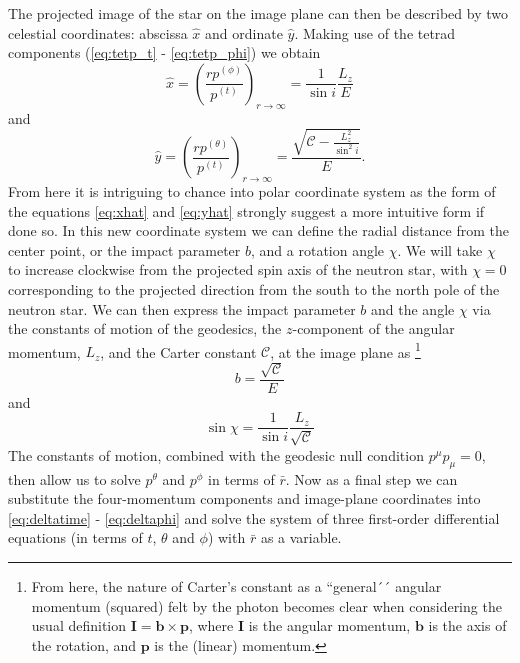 \documentclass[iop, usenatbib]{emulateapj}
\newcommand{\be}{\begin{equation}}
\newcommand{\ee}{\end{equation}}
\renewcommand{\vec}[1]{\ensuremath{\boldsymbol{#1}}​}
\newcommand{\Ca}{\ensuremath{\mathcal{C}}}
\newcommand{\rb}{\ensuremath{\bar{r}}}
\newcommand{\wb}{\ensuremath{\bar{\omega}}}
\newcommand{\nub}{\ensuremath{\bar{\nu}}}
\begin{document}
The projected image of the star on the image plane can then be described by two celestial coordinates:
abscissa $\hat{x}$ and ordinate $\hat{y}$.
Making use of the tetrad components (\ref{eq:tetp_t} - \ref{eq:tetp_phi}) we obtain \citep[][p.347]{cha}
\be\label{eq:xhat}
\hat{x} = \left( \frac{rp^{(\phi)}}{p^{(t)}} \right)_{r \rightarrow \infty} = \frac{1}{\sin i} \frac{L_z}{E}
\ee
and
\be\label{eq:yhat}
\hat{y} = \left( \frac{rp^{(\theta)}}{p^{(t)}} \right)_{r \rightarrow \infty} = \frac{\sqrt{\Ca - \frac{L_z^2}{\sin^2 i}}}{E}.
\ee
From here it is intriguing to chance into polar coordinate system as the form of the equations \eqref{eq:xhat} and \eqref{eq:yhat} strongly suggest a more intuitive form if done so.
In this new coordinate system we can define the radial distance from the center point, or the impact parameter $b$, and a rotation angle $\chi$.
We will take $\chi$ to increase clockwise from the projected spin axis of the neutron star, with $\chi=0$ corresponding to the projected direction from the south to the north pole of the neutron star.
We can then express the impact parameter $b$ and the angle $\chi$ via the constants of motion of the geodesics, the $z$-component of the angular momentum, $L_z$, and the Carter constant $\Ca$, at the image plane as%
\footnote{From here, the nature of Carter's constant as a ``general´´ angular momentum (squared) felt by the photon becomes clear when considering the usual definition $\vec{I} = \vec{b} \times \vec{p}$, where $\vec{I}$ is the angular momentum, $\vec{b}$ is the axis of the rotation, and $\vec{p}$ is the (linear) momentum.} 
\be
b = \frac{\sqrt{\Ca}}{E}
\ee
and
\be
\sin \chi = \frac{1}{\sin i} \frac{L_z}{\sqrt{\Ca}}
\ee
The constants of motion, combined with the geodesic null condition $p^\mu p_\mu = 0$, then allow us to solve $p^\theta$ and $p^\phi$ in terms of $\rb$.
Now as a final step we can substitute the four-momentum components and image-plane coordinates into \eqref{eq:deltatime} - \eqref{eq:deltaphi} and solve the system of three first-order differential equations (in terms of $t$, $\theta$ and $\phi$) with $\rb$ as a variable.
\end{document}
